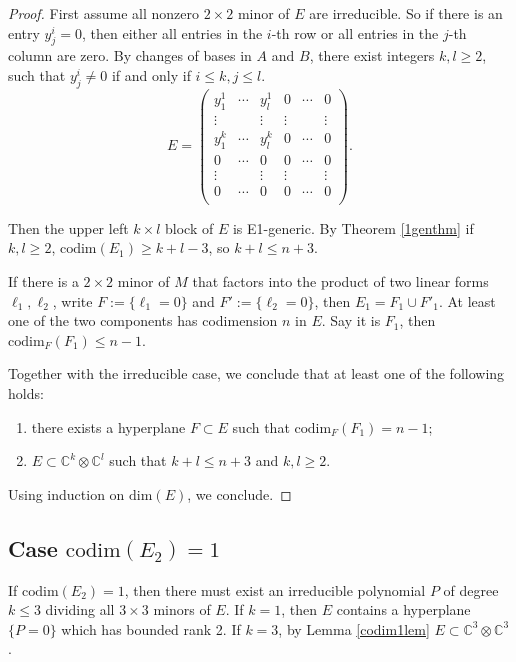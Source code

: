 \documentclass[10pt]{article} %
\theoremstyle{definition}
\begin{document}
\begin{proof}
First assume all nonzero $2\times 2$ minor of $E$ are irreducible. So if there is an entry $y^i_j=0$, then either all entries in the $i$-th row or all entries in the $j$-th column are zero. By changes of bases in $A$ and $B$, there exist integers $k,l\geq2$, such that $y^i_j\neq 0$ if and only if $i\leq k, j\leq l$. 
$$E=\begin{pmatrix}
y^1_1 & \cdots & y^1_l & 0 & \cdots & 0\\
\vdots & & \vdots & \vdots & &\vdots\\
y^k_1 & \cdots & y^k_l & 0 & \cdots & 0\\
0 & \cdots & 0 & 0 & \cdots & 0\\
\vdots & & \vdots & \vdots & &\vdots\\
0 & \cdots & 0 & 0 & \cdots & 0\\
\end{pmatrix}.$$

Then the upper left $k\times l$ block of $E$ is E1-generic. By Theorem \ref{1genthm} if $k,l\geq 2$, $\mathrm{codim}(E_1)\geq k+l-3$, so $k+l\leq n+3$.

If there is a $2\times 2$ minor of $M$ that factors into the product of two linear forms $\ell_1,\ell_2$, write $F:=\{\ell_1=0\}$ and $F':=\{\ell_2=0\}$, then $E_1=F_1\cup F'_1$. At least one of the two components has codimension $n$ in $E$. Say it is $F_1$, then $\mathrm{codim}_F (F_1)\leq n-1$. 

Together with the irreducible case, we conclude that at least one of the following holds:
\begin{enumerate}
    \item there exists a hyperplane $F\subset E$ such that $\mathrm{codim}_F (F_1)=n-1$;
    \item $E\subset \mathbb{C}^{k}\otimes\mathbb{C}^{l}$ such that $k+l\leq n+3$ and $k,l\geq 2$.
\end{enumerate}

Using induction on $\mathrm{dim}(E)$, we conclude.
\end{proof}

\subsection{Case $\mathrm{codim}(E_2)=1$}\label{E2codim1Section}
If $\mathrm{codim}(E_2)=1$, then there must exist an irreducible polynomial $P$ of degree $k\leq 3$ dividing all $3\times 3$ minors of $E$. If $k=1$, then $E$ contains a hyperplane $\{P=0\}$ which has bounded rank 2. If $k=3$, by Lemma \ref{codim1lem} $E\subset \mathbb{C}^3\otimes\mathbb{C}^3$.  
\end{document}
